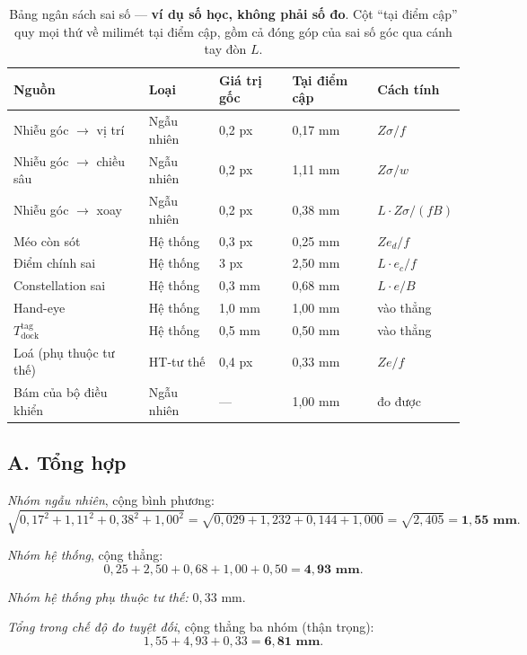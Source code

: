 \documentclass[../../marker.tex]{subfiles}
\begin{document}
\begin{table}[H]\centering\small
\caption{Bảng ngân sách sai số --- \textbf{ví dụ số học, không phải số đo}. Cột ``tại điểm cập'' quy mọi thứ về milimét tại điểm cập, gồm cả đóng góp của sai số góc qua cánh tay đòn \(L\).}
\label{tab:c15-bang}
\begin{tabularx}{\linewidth}{@{}L{3.5cm}L{1.5cm}L{1.4cm}L{1.5cm}Y@{}}
\toprule
\textbf{Nguồn} & \textbf{Loại} & \textbf{Giá trị gốc} & \textbf{Tại điểm cập} & \textbf{Cách tính}\\
\midrule
Nhiễu góc \(\rightarrow\) vị trí & Ngẫu nhiên & 0,2 px & 0,17 mm & \(Z\sigma/f\)\\
Nhiễu góc \(\rightarrow\) chiều sâu & Ngẫu nhiên & 0,2 px & 1,11 mm & \(Z\sigma/w\)\\
Nhiễu góc \(\rightarrow\) xoay & Ngẫu nhiên & 0,2 px & 0,38 mm & \(L\cdot Z\sigma/(fB)\)\\
\midrule
Méo còn sót & Hệ thống & 0,3 px & 0,25 mm & \(Z e_d/f\)\\
Điểm chính sai & Hệ thống & 3 px & 2,50 mm & \(L\cdot e_c/f\)\\
Constellation sai & Hệ thống & 0,3 mm & 0,68 mm & \(L\cdot e/B\)\\
Hand-eye & Hệ thống & 1,0 mm & 1,00 mm & vào thẳng\\
\(T^{\text{tag}}_{\text{dock}}\) & Hệ thống & 0,5 mm & 0,50 mm & vào thẳng\\
\midrule
Loá (phụ thuộc tư thế) & HT-tư thế & 0,4 px & 0,33 mm & \(Z e/f\)\\
\midrule
Bám của bộ điều khiển & Ngẫu nhiên & --- & 1,00 mm & đo được\\
\bottomrule
\end{tabularx}
\end{table}

\subsection{A. Tổng hợp}

\emph{Nhóm ngẫu nhiên}, cộng bình phương:
\[
\sqrt{0{,}17^2 + 1{,}11^2 + 0{,}38^2 + 1{,}00^2} = \sqrt{0{,}029 + 1{,}232 + 0{,}144 + 1{,}000} = \sqrt{2{,}405} = \mathbf{1{,}55\text{ mm}}.
\]

\emph{Nhóm hệ thống}, cộng thẳng:
\[
0{,}25 + 2{,}50 + 0{,}68 + 1{,}00 + 0{,}50 = \mathbf{4{,}93\text{ mm}}.
\]

\emph{Nhóm hệ thống phụ thuộc tư thế:} \(0{,}33\) mm.

\emph{Tổng trong chế độ đo tuyệt đối}, cộng thẳng ba nhóm (thận trọng):
\[
1{,}55 + 4{,}93 + 0{,}33 = \mathbf{6{,}81\text{ mm}}.
\]
\end{document}
